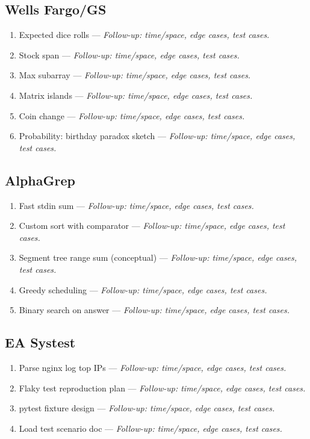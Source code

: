 \documentclass[9pt,a4paper]{article}
\begin{document}
\subsection{Wells Fargo/GS}
\begin{enumerate}
  \item Expected dice rolls --- \textit{Follow-up: time/space, edge cases, test cases.}
  \item Stock span --- \textit{Follow-up: time/space, edge cases, test cases.}
  \item Max subarray --- \textit{Follow-up: time/space, edge cases, test cases.}
  \item Matrix islands --- \textit{Follow-up: time/space, edge cases, test cases.}
  \item Coin change --- \textit{Follow-up: time/space, edge cases, test cases.}
  \item Probability: birthday paradox sketch --- \textit{Follow-up: time/space, edge cases, test cases.}
\end{enumerate}
\subsection{AlphaGrep}
\begin{enumerate}
  \item Fast stdin sum --- \textit{Follow-up: time/space, edge cases, test cases.}
  \item Custom sort with comparator --- \textit{Follow-up: time/space, edge cases, test cases.}
  \item Segment tree range sum (conceptual) --- \textit{Follow-up: time/space, edge cases, test cases.}
  \item Greedy scheduling --- \textit{Follow-up: time/space, edge cases, test cases.}
  \item Binary search on answer --- \textit{Follow-up: time/space, edge cases, test cases.}
\end{enumerate}
\subsection{EA Systest}
\begin{enumerate}
  \item Parse nginx log top IPs --- \textit{Follow-up: time/space, edge cases, test cases.}
  \item Flaky test reproduction plan --- \textit{Follow-up: time/space, edge cases, test cases.}
  \item pytest fixture design --- \textit{Follow-up: time/space, edge cases, test cases.}
  \item Load test scenario doc --- \textit{Follow-up: time/space, edge cases, test cases.}
\end{enumerate}
\end{document}
